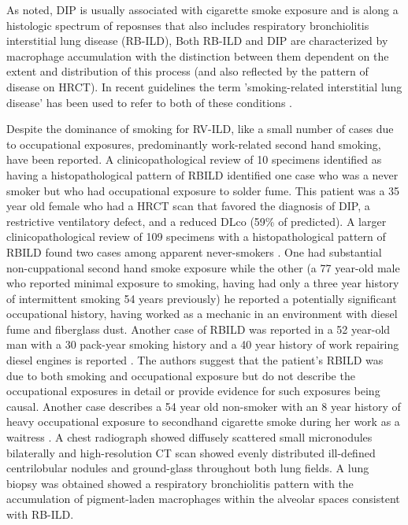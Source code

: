 \documentclass[a4
er,12pt]{article}
\begin{document}
As noted, DIP is usually associated with cigarette smoke exposure and is along a histologic spectrum of reposnses that also includes respiratory bronchiolitis interstitial lung disease (RB-ILD), Both RB-ILD and DIP are characterized by macrophage accumulation with the distinction between them dependent on the extent and distribution of this process (and also reflected by the pattern of disease on HRCT). In recent guidelines the term ’smoking-related interstitial lung disease’ has been used to refer to both of these conditions \cite{Travis2013}. 

Despite the dominance of smoking for RV-ILD, like a small number of cases due to occupational exposures, predominantly work-related second hand smoking, have been reported.
A clinicopathological review of 10 specimens identified as having a histopathological pattern of RBILD \cite{Moon1999} identified one case who was a never smoker but who had occupational exposure to solder fume. This patient was a 35 year old female who had a HRCT scan that favored the diagnosis of DIP, a restrictive ventilatory defect, and a reduced DLco (59\% of predicted). A larger clinicopathological review of 109 specimens with a histopathological pattern of RBILD found two cases among apparent never-smokers \cite{Fraig2002}. One had substantial non-cuppational second hand smoke exposure while the other (a 77 year-old male who reported minimal exposure to smoking, having had only a three year history of intermittent smoking 54 years previously) he reported a potentially significant occupational history, having worked as a mechanic in an environment with diesel fume and fiberglass dust. Another case of RBILD was reported in a 52 year-old man with a 30 pack-year smoking history and a 40 year history of work repairing diesel engines is reported \cite{Canessa2004}. The authors suggest that the patient’s RBILD was due to both smoking and occupational exposure but do not describe the occupational exposures in detail or provide evidence for such exposures being causal. Another case describes a 54 year old non-smoker with an 8 year history of heavy occupational exposure to secondhand cigarette smoke during her work as a waitress \cite{Woo2007}. A chest radiograph showed diffusely scattered small micronodules bilaterally and high-resolution CT scan showed evenly distributed ill-defined centrilobular nodules and ground-glass throughout both lung fields. A lung biopsy was obtained showed a respiratory bronchiolitis pattern with the accumulation of pigment-laden macrophages within the alveolar spaces consistent with RB-ILD.
\end{document}
